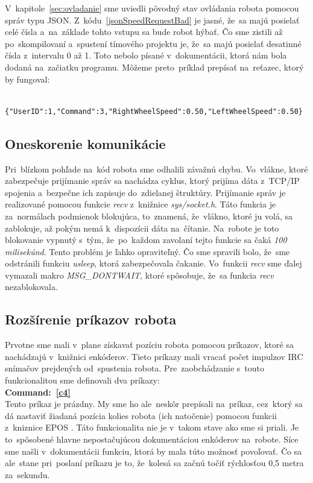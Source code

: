 V~kapitole~\ref{sec:ovladanie} sme uviedli pôvodný stav ovládania robota pomocou správ typu JSON.
Z~kódu~\ref{jsonSpeedRequestBad} je jasné, že~sa majú posielať celé čísla a~na~základe tohto vstupu sa bude robot hýbať. Čo sme zistili až
po~skompilovaní a~spustení tímového projektu je, že~sa majú posielať desatinné čísla z~intervalu 0 až 1. Toto nebolo písané
v~dokumentácii, ktorá nám bola dodaná na~začiatku programu. Môžeme preto~príklad prepísať na~reťazec, ktorý by fungoval:

	\label{jsonSpeedRequestGood}
	\begin{lstlisting}
			{"UserID":1,"Command":3,"RightWheelSpeed":0.50,"LeftWheelSpeed":0.50}
	\end{lstlisting}

\subsection{Oneskorenie komunikácie}
\label{subsec:communicationDelay}

Pri~blízkom pohľade na~kód robota sme odhalili závažnú chybu. Vo~vlákne, ktoré zabezpečuje prijímanie správ sa nachádza
cyklus, ktorý prijíma dáta z~TCP/IP spojenia a~bezpečne ich zapisuje do~zdielanej štruktúry. Prijímanie správ je realizované
pomocou funkcie \textit{recv} z~knižnice \textit{sys/socket.h}. Táto funkcia je za~normálach podmienok blokujúca, to~znamená,
že~vlákno, ktoré ju volá, sa zablokuje, až pokým nemá k~dispozícii dáta na~čítanie. Na~robote je toto blokovanie
vypnutý s~tým, že~po~každom zavolaní tejto funkcie sa čaká \textit{100 milisekúnd}. Tento problém je ľahko opraviteľný.
Čo sme spravili bolo, že~sme odstránili funkciu \textit{usleep}, ktorá zabezpečovala čakanie. Vo~funkcii \textit{recv}
sme ďalej vymazali makro \textit{MSG\_DONTWAIT}, ktoré spôsobuje, že~sa funkcia \textit{recv} nezablokovala.

\subsection{Rozšírenie príkazov robota}
\label{subsec:extendRobotCommands}

Prvotne sme mali v~plane získavať pozíciu robota pomocou príkazov, ktoré sa nachádzajú v~knižnici enkóderov.
Tieto príkazy mali vracať počet impulzov IRC snímačov prejdených od~spustenia robota.
Pre~zaobchádzanie s~touto funkcionalitou sme definovali dva príkazy:\\

\noindent \textbf{Command:~\ref{c4}} \\
\indent Tento príkaz je prázdny. My sme ho ale~neskôr prepísali na~príkaz, cez~ktorý sa dá nastaviť
žiadaná pozícia kolies robota (ich natočenie) pomocou funkcii z~kniznice EPOS \cite{EPOSdoc}.
Táto funkcionalita nie je v~takom stave ako sme si priali. Je to~spôsobené hlavne nepostačujúcou dokumentáciou enkóderov na~robote. Síce sme našli
v~dokumentácii funkciu, ktorá by mala túto možnosť povoľovať. Čo sa ale~stane pri~poslaní príkazu je to, že~kolesá sa začnú točiť rýchlosťou
0,5 metra za~sekundu.\\


